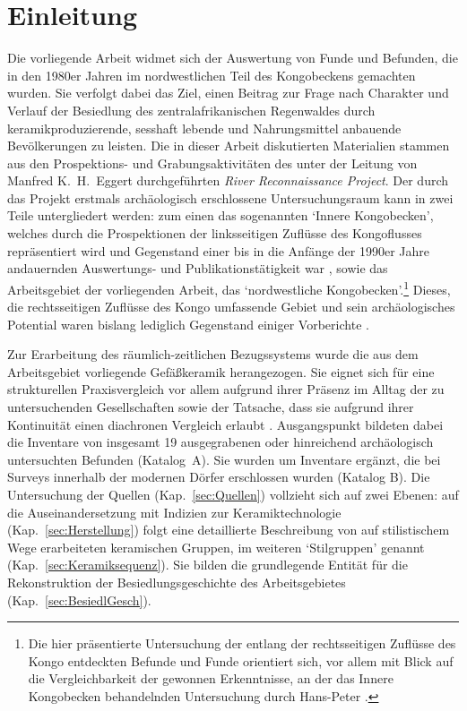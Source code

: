 \chapter{Einleitung}

Die vorliegende Arbeit widmet sich der Auswertung von Funde und Befunden, die in den 1980er Jahren im nordwestlichen Teil des Kongobeckens gemachten wurden. Sie verfolgt dabei das Ziel, einen Beitrag zur Frage nach Charakter und Verlauf der Besiedlung des zentralafrikanischen Regenwaldes durch keramikproduzierende, sesshaft lebende und Nahrungsmittel anbauende Bevölkerungen zu leisten. Die in dieser Arbeit diskutierten Materialien stammen aus den Prospektions- und Grabungsaktivitäten des unter der Leitung von Manfred K.~H.~Eggert durchgeführten \textit{River Reconnaissance Project}. Der durch das Projekt erstmals archäologisch erschlossene Untersuchungsraum \parencite[siehe][295 Abb.~16.2]{Eggert.1993} kann in zwei Teile untergliedert werden: zum einen das sogenannten \enquote*{Innere Kongobecken}, welches durch die Prospektionen der linksseitigen Zuflüsse des Kongoflusses repräsentiert wird und Gegenstand einer bis in die Anfänge der 1990er Jahre andauernden Auswertungs- und Publikationstätigkeit war \parencites{Eggert.1980b}{Eggert.1981}{Eggert.1983}{Eggert.1984}{Eggert.1984b}{Eggert.1987}{Wotzka.1995}, sowie das Arbeitsgebiet der vorliegenden Arbeit, das \enquote*{nordwestliche Kongobecken}.\footnote{Die hier präsentierte Untersuchung der entlang der rechtsseitigen Zuflüsse des Kongo entdeckten Befunde und Funde orientiert sich, vor allem mit Blick auf die Vergleichbarkeit der gewonnen Erkenntnisse, an der das Innere Kongobecken behandelnden Untersuchung durch Hans-Peter \textcite{Wotzka.1995}.} Dieses, die rechtsseitigen Zuflüsse des Kongo umfassende Gebiet und sein archäologisches Potential waren bislang lediglich Gegenstand einiger Vorberichte \parencites{Eggert.1987c}{Eggert.1992}{Eggert.1993}. 

Zur Erarbeitung des räumlich-zeitlichen Bezugssystems wurde die aus dem Arbeitsgebiet vorliegende Gefäßkeramik herangezogen. Sie eignet sich für eine strukturellen Praxisvergleich vor allem aufgrund ihrer Präsenz im Alltag der zu untersuchenden Gesellschaften sowie der Tatsache, dass sie aufgrund ihrer Kontinuität einen diachronen Vergleich erlaubt \parencite[86]{Saev.2015}. Ausgangspunkt bildeten dabei die Inventare von insgesamt 19 ausgegrabenen oder hinreichend archäologisch untersuchten Befunden (Katalog~A). Sie wurden um Inventare ergänzt, die bei Surveys innerhalb der modernen Dörfer erschlossen wurden (Katalog B). Die Untersuchung der Quellen (Kap.~\ref{sec:Quellen}) vollzieht sich auf zwei Ebenen: auf die Auseinandersetzung mit Indizien zur Keramiktechnologie (Kap.~\ref{sec:Herstellung}) folgt eine detaillierte Beschreibung von auf stilistischem Wege erarbeiteten keramischen Gruppen, im weiteren \enquote*{Stilgruppen} genannt (Kap.~\ref{sec:Keramiksequenz}). Sie bilden die grundlegende Entität für die Rekonstruktion der Besiedlungsgeschichte des Arbeitsgebietes (Kap.~\ref{sec:BesiedlGesch}).

